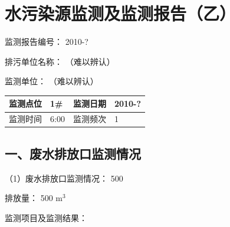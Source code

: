 \documentclass[UTF8,10pt,a4paper,fontset=fandol]{ctexart}
\newcommand{\fieldvalue}[1]{#1}
\newcommand{\handwritten}[1]{#1}
\begin{document}
\newpage

\section*{水污染源监测及监测报告（乙）}

\noindent
监测报告编号：%
\fieldvalue{\handwritten{2010-?}}

\noindent
排污单位名称：%
\fieldvalue{\handwritten{（难以辨认）}}

\noindent
监测单位：%
\fieldvalue{\handwritten{（难以辨认）}}

\begin{tabularx}{\textwidth}{|p{}|X|p{}|X|}
\hline
监测点位 & 
\fieldvalue{\handwritten{1\#}} &
监测日期 &
\fieldvalue{\handwritten{2010-?}} \\
\hline
监测时间 &
\fieldvalue{\handwritten{6:00}} &
监测频次 &
\fieldvalue{\handwritten{1}} \\
\hline
\end{tabularx}

\subsection*{一、废水排放口监测情况}

\noindent
（1）废水排放口监测情况：%
\fieldvalue{\handwritten{500}}

\noindent
排放量：%
\fieldvalue{\handwritten{500 m$^3$}}

\noindent
监测项目及监测结果：
\end{document}

